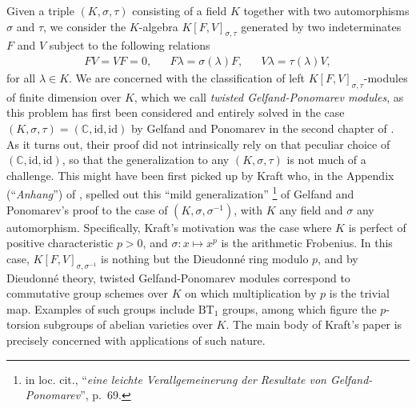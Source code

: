 \documentclass[12pt]{amsart}
\theoremstyle{definition}
\newcommand{\<}{\langle}   %
\renewcommand{\>}{\rangle} %
\begin{document}
Given a triple $(K,\sigma,\tau)$ consisting of a field $K$ together with two automorphisms $\sigma$ and $\tau$, we consider the $K$-algebra $K[F,V]_{\sigma,\tau}$ generated by two indeterminates $F$ and $V$ subject to the following relations 
\begin{align*}
    FV = VF = 0, & & F\lambda = \sigma(\lambda)F, & & V\lambda = \tau(\lambda)V,
\end{align*}
for all $\lambda \in K$. We are concerned with the classification of left $K[F,V]_{\sigma,\tau}$-modules of finite dimension over $K$, which we call \textit{twisted Gelfand-Ponomarev modules}, as this problem has first been considered and entirely solved in the case $(K,\sigma,\tau) = (\mathbb C,\mathrm{id},\mathrm{id})$ by Gelfand and Ponomarev in the second chapter of \cite{gelfand-ponomarev:1968}. As it turns out, their proof did not intrinsically rely on that peculiar choice of $(\mathbb C,\mathrm{id},\mathrm{id})$, so that the generalization to any $(K,\sigma,\tau)$ is not much of a challenge. This might have been first picked up by Kraft who, in the Appendix (``\textit{Anhang}'') of \cite{kraft:1975}, spelled out this ``mild generalization'' \footnote{in loc. cit., ``\textit{eine leichte Verallgemeinerung der Resultate von Gelfand-Ponomarev}'', p.~69.} of Gelfand and Ponomarev's proof to the case of $(K,\sigma,\sigma^{-1})$, with $K$ any field and $\sigma$ any automorphism. Specifically, Kraft's motivation was the case where $K$ is perfect of positive characteristic $p > 0$, and $\sigma: x \mapsto x^p$ is the arithmetic Frobenius. In this case, $K[F,V]_{\sigma,\sigma^{-1}}$ is nothing 
but the Dieudonné ring modulo $p$, and by Dieudonné theory, twisted Gelfand-Ponomarev modules correspond to commutative group schemes over $K$ on which multiplication by $p$ is the trivial map. Examples of such groups include $\mathrm{BT}_1$ groups, among which figure the $p$-torsion subgroups of abelian varieties over $K$. The main body of Kraft's paper \cite{kraft:1975} is precisely concerned with applications of such nature.\\
\end{document}
